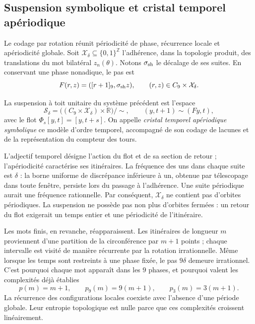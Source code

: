 \subsection{Suspension symbolique et cristal temporel apériodique}
\label{x_reciprocidad:mono-ampl:cristal}

Le codage par rotation réunit périodicité de phase, récurrence locale
et apériodicité globale. Soit \(\mathcal X_\delta\subseteq\{0,1\}^{\mathbb Z}\)
l'adhérence, dans la topologie produit, des translations du mot
bilatéral \(z_n(\theta)\). Notons \(\sigma_{\rm sh}\) le
décalage de ses suites. En conservant une phase nonadique, le pas est
\[
 F(r,z)=([r+1]_9,\sigma_{\rm sh}z),\qquad
 (r,z)\in C_9\times\mathcal X_\delta.
\]

\begin{definition}
\label{x_reciprocidad:mono-ampl:def-cristal}
La suspension à toit unitaire du système précédent est l'espace
\[
 \mathcal S_\delta=
 \bigl((C_9\times\mathcal X_\delta)\times\mathbb R\bigr)/\sim,
 \qquad (y,t+1)\sim(Fy,t),
\]
avec le flot \(\Phi_s[y,t]=[y,t+s]\). On appelle \emph{cristal temporel
apériodique symbolique} ce modèle d'ordre temporel, accompagné de son
codage de lacunes et de la représentation du compteur des tours.
\end{definition}

L'adjectif temporel désigne l'action du flot et de sa section de retour ;
l'apériodicité caractérise ses itinéraires. La fréquence des uns dans chaque
suite est \(\delta\) : la borne uniforme de discrépance inférieure à un,
obtenue par télescopage dans toute fenêtre, persiste lors du passage à l'adhérence.
Une suite périodique aurait une fréquence rationnelle. Par conséquent,
\(\mathcal X_\delta\) ne contient pas d'orbites périodiques. La suspension
ne possède pas non plus d'orbites fermées : un retour du flot exigerait un temps
entier et une périodicité de l'itinéraire.

Les mots finis, en revanche, réapparaissent. Les itinéraires de longueur \(m\)
proviennent d'une partition de la circonférence par \(m+1\) points ; chaque
intervalle est visité de manière récurrente par la rotation irrationnelle. Même
lorsque les temps sont restreints à une phase fixée, le pas \(9\delta\) demeure
irrationnel. C'est pourquoi chaque mot apparaît dans les
\(9\) phases, et pourquoi valent les complexités déjà établies
\[
 p(m)=m+1,\qquad p_9(m)=9(m+1),\qquad p_3(m)=3(m+1).
\]
La récurrence des configurations locales coexiste avec l'absence d'une
période globale. Leur entropie topologique est nulle parce que ces complexités
croissent linéairement.

